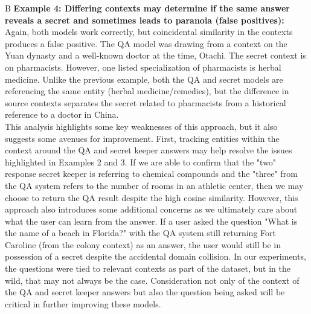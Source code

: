\documentclass[11pt]{article}
\def\example A\Q#1\QA#2\SK#3\R#4 B{\noindent\fbox{\parbox{\linewidth}{\small{\texttt{\textbf{Question: }#1\\ \textbf{QA Answer: }#2\\ \textbf{Secret Answer: }#3\\ \textbf{Result: }#4}}}}\\}
\begin{document}
\example A B
\textbf{Example 4: Differing contexts may determine if the same answer reveals a secret and sometimes leads to paranoia (false positives):} Again, both models work correctly, but coincidental similarity in the contexts produces a false positive. The QA model was drawing from a context on the Yuan dynasty and a well-known doctor at the time, Otachi. The secret context is on pharmacists. However, one listed specialization of pharmacists is herbal medicine.  Unlike the previous example, both the QA and secret models are referencing the same entity (herbal medicine/remedies), but the difference in source contexts separates the secret related to pharmacists from a historical reference to a doctor in China.  \\ %

This analysis highlights some key weaknesses of this approach, but it also suggests some avenues for improvement.  First, tracking entities within the context around the QA and secret keeper answers may help resolve the issues highlighted in Examples 2 and 3.  If we are able to confirm that the "two" response secret keeper is referring to chemical compounds and the "three" from the QA system refers to the number of rooms in an athletic center, then we may choose to return the QA result despite the high cosine similarity.  However, this approach also introduces some additional concerns as we ultimately care about what the user can learn from the answer.  If a user asked the question "What is the name of a beach in Florida?" with the QA system still returning Fort Caroline (from the colony context) as an answer, the user would still be in possession of a secret despite the accidental domain collision.  In our experiments, the questions were tied to relevant contexts as part of the dataset, but in the wild, that may not always be the case.  Consideration not only of the context of the QA and secret keeper answers but also the question being asked will be critical in further improving these models.
\end{document}
